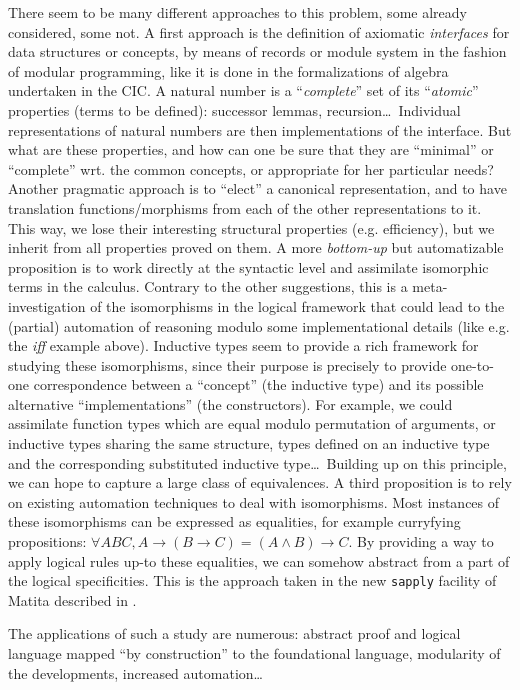 \documentclass[twoside,a4paper,12pt]{article}
\begin{document}
There seem to be many different approaches to this problem, some
already considered, some not. A first approach is the definition of
axiomatic \emph{interfaces} for data structures or concepts, by means
of records or module system in the fashion of modular programming,
like it is done in the formalizations of algebra undertaken in the
CIC. A natural number is a ``\emph{complete}'' set of its
``\emph{atomic}'' properties (terms to be defined): successor lemmas,
recursion\ldots\ Individual representations of natural numbers are
then implementations of the interface. But what are these properties,
and how can one be sure that they are ``minimal'' or ``complete''
wrt. the common concepts, or appropriate for her particular needs?
Another pragmatic approach is to ``elect'' a canonical representation,
and to have translation functions/morphisms from each of the other
representations to it. This way, we lose their interesting structural
properties (e.g. efficiency), but we inherit from all properties
proved on them. A more \emph{bottom-up} but automatizable proposition
is to work directly at the syntactic level and assimilate isomorphic
terms in the calculus. Contrary to the other suggestions, this is a
meta-investigation of the isomorphisms in the logical framework that
could lead to the (partial) automation of reasoning modulo some
implementational details (like e.g. the \emph{iff} example
above). Inductive types seem to provide a rich framework for studying
these isomorphisms, since their purpose is precisely to provide
one-to-one correspondence between a ``concept'' (the inductive type)
and its possible alternative ``implementations'' (the
constructors). For example, we could assimilate function types which
are equal modulo permutation of arguments, or inductive types sharing
the same structure, types defined on an inductive type and the
corresponding substituted inductive type\ldots\ Building up on this
principle, we can hope to capture a large class of equivalences. A
third proposition is to rely on existing automation techniques to deal
with isomorphisms. Most instances of these isomorphisms can be
expressed as equalities, for example curryfying propositions: $\forall
A B C, A\to(B\to C) = (A\wedge B)\to C$. By providing a way to apply
logical rules up-to these equalities, we can somehow abstract from a
part of the logical specificities. This is the approach taken in the
new \texttt{sapply} facility of \textsf{Matita} described in
\cite{asperti2010paramodulation}.

The applications of such a study are numerous: abstract proof and
logical language mapped ``by construction'' to the foundational
language, modularity of the developments, increased automation\ldots
\end{document}
